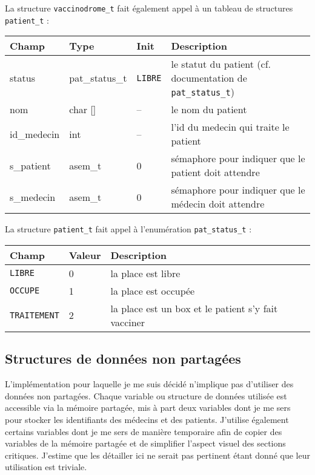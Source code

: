 \documentclass[a4paper]{article}
\begin{document}
\bigskip La structure \texttt{vaccinodrome\_t} fait également appel à un tableau de structures \texttt{patient\_t} :
\bigskip \newline
  \begin{tabularx}{\linewidth}{|l|l|l|X|}
    \hline
    Champ & Type & Init & Description \\ \hline%
    status & pat\_status\_t & \texttt{LIBRE} & le statut du patient (cf. documentation de
    \texttt{pat\_status\_t})\\ \hline%
    nom & char [] & -- & le nom du patient \\ \hline%
    id\_medecin & int & -- & l'id du medecin qui traite le patient \\ \hline%
    s\_patient & asem\_t & 0 & sémaphore pour indiquer que le patient doit attendre \\ \hline%
    s\_medecin & asem\_t & 0 & sémaphore pour indiquer que le médecin doit attendre \\ \hline%
  \end{tabularx}

\bigskip La structure \texttt{patient\_t} fait appel à l'enumération \texttt{pat\_status\_t} :
\bigskip \newline
  \begin{tabularx}{\linewidth}{|l|l|X|}
    \hline
    Champ & Valeur & Description \\ \hline%
    \texttt{LIBRE} & 0 & la place est libre \\ \hline%
    \texttt{OCCUPE} & 1 & la place est occupée \\ \hline%
    \texttt{TRAITEMENT} & 2 & la place est un box et le patient s'y fait vacciner \\ \hline%
  \end{tabularx}
  
\subsection{Structures de données non partagées}

L'implémentation pour laquelle je me suis décidé n'implique pas d'utiliser des données non partagées. Chaque variable ou structure de données utilisée est accessible via la mémoire partagée, mis à part deux variables dont je me sers pour stocker les identifiants des médecins et des patients. J'utilise également certains variables dont je me sers de manière temporaire afin de copier des variables de la mémoire partagée et de simplifier l'aspect visuel des sections critiques. J'estime que les détailler ici ne serait pas pertinent étant donné que leur utilisation est triviale.
\end{document}
